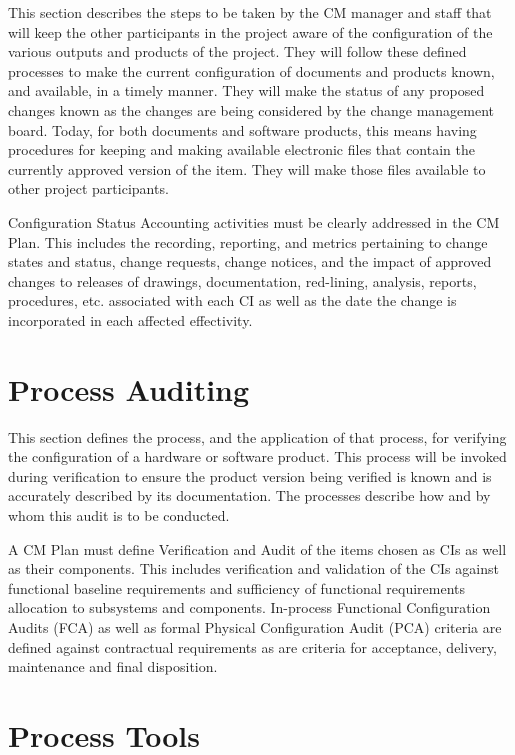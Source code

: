 This section describes the steps to be taken by the CM manager and staff that will keep the other participants in the project aware of the configuration of the various outputs and products of the project. 
They will follow these defined processes to make the current configuration of documents and products known, and available, in a timely manner. 
They will make the status of any proposed changes known as the changes are being considered by the change management board.
Today, for both documents and software products, this means having procedures for keeping and making available electronic files that contain the currently approved version of the item. 
They will make those files available to other project participants.

Configuration Status Accounting activities must be clearly addressed in the CM Plan. 
This includes the recording, reporting, and metrics pertaining to change states and status, change requests, change notices, and the impact of approved changes to releases of drawings, documentation, red-lining, analysis, reports, procedures, etc. associated with each CI as well as the date the change is incorporated in each affected effectivity.

\section{Process Auditing}
\label{loc:CM_ProcessAuditing}

This section defines the process, and the application of that process, for verifying the configuration of a hardware or software product. 
This process will be invoked during verification to ensure the product version being verified is known and is accurately described by its documentation. 
The processes describe how and by whom this audit is to be conducted.

A CM Plan must define Verification and Audit of the items chosen as CIs as well as their components. 
This includes verification and validation of the CIs against functional baseline requirements and sufficiency of functional requirements allocation to subsystems and components. 
In-process Functional Configuration Audits (FCA) as well as formal Physical Configuration Audit (PCA) criteria are defined against contractual requirements as are criteria for acceptance, delivery, maintenance and final disposition.


\section{Process Tools}
\label{loc:CM_ProcessTools}